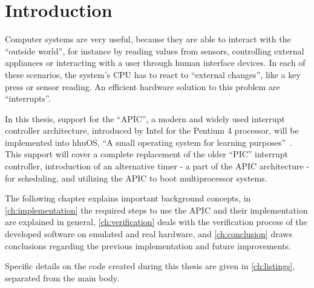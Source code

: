 \chapter{Introduction}
\label{ch:introduction}

Computer systems are very useful, because they are able to interact with the ``outside world'', for
instance by reading values from sensors, controlling external appliances or interacting with a user
through human interface devices. In each of these scenarios, the system's CPU has to react to
``external changes'', like a key press or sensor reading. An efficient hardware solution to this
problem are ``interrupts''.

In this thesis, support for the ``APIC'', a modern and widely used interrupt controller
architecture, introduced by Intel for the Pentium 4 processor, will be implemented into hhuOS, ``A
small operating system for learning purposes''~\cite{hhuos}. This support will cover a complete
replacement of the older ``PIC'' interrupt controller, introduction of an alternative timer - a
part of the APIC architecture - for scheduling, and utilizing the APIC to boot multiprocessor
systems.

The following chapter explains important background concepts, in \autoref{ch:implementation} the
required steps to use the APIC and their implementation are explained in general,
\autoref{ch:verification} deals with the verification process of the developed software on emulated
and real hardware, and \autoref{ch:conclusion} draws conclusions regarding the previous
implementation and future improvements.

Specific details on the code created during this thesis are given in \autoref{ch:listings},
separated from the main body.

\clearpage